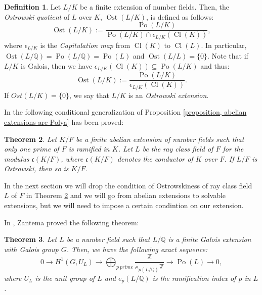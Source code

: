 \documentclass{amsart}
\newtheorem{theorem}{Theorem}[section]
\theoremstyle{definition}
\newtheorem{definition}[theorem]{Definition}
\numberwithin{equation}{section}
\DeclareMathOperator{\Po}{Po}
\DeclareMathOperator{\Ost}{Ost}
\DeclareMathOperator{\Cl}{Cl}
\begin{document}
\begin{definition} \label{definition, Ostrowski quotient}
Let $L/K$ be a finite extension of number fields. Then, the \textit{Ostrowski quotient} of $L$ over $K$, $\Ost(L/K)$, is defined as follows:
	\begin{equation*} \label{equation, Ostrowski quotient}
	\Ost(L/K) := \frac{\Po(L/K)}{\Po(L/K) \cap \epsilon_{L/K}(\Cl(K))},
	\end{equation*} 
	where $\epsilon_{L/K}$ is the \textit{Capitulation map} from $\Cl(K)$ to $\Cl(L)$.
	In particular, $\Ost(L/\mathbb{Q})=\Po(L/\mathbb{Q})=\Po(L)$ and $\Ost(L/L)=\{0\}$. Note that if $L/K$ is Galois, then we have $\epsilon_{L/K}(\Cl(K)) \subseteq \Po(L/K)$ and thus:
	\begin{equation*} \label{equation, Ostrowski quotient Galois case}
	\Ost(L/K) := \frac{\Po(L/K)}{\epsilon_{L/K}(\Cl(K))}.
	\end{equation*} 
If $Ost(L/K)=\{0\}$, we say that $L/K$ is an \textit{Ostrowski extension}.
\end{definition}

In \cite{SRM} the following conditional generalization of Proposition \ref{proposition, abelian extensions are Polya} has been proved:

\begin{theorem} \cite[Theorem $3.6$]{SRM} \label{theorem, abelian extensions are Ostrowski, conditional}
Let $K/F$ be a finite abelian extension of number fields such that only one prime of $F$ is ramified in $K$. Let $L$ be the ray class field of $F$ for the modulus $\mathfrak{c}(K/F)$, where $\mathfrak{c}(K/F)$ denotes the conductor of $K$ over $F$. If $L/F$ is Ostrowski, then so is $K/F$.
\end{theorem} 

In the next section we will drop the condition of Ostrowskiness of ray class field $L$ of $F$ in Theorem \ref{theorem, abelian extensions are Ostrowski, conditional} and we will go from abelian extensions to solvable extensions, but we will need to impose a certain condintion on our extension.

In \cite[p.$163$]{Zantema}, Zantema proved the following theorem:

\begin{theorem} \label{theorem, Zantema's exact sequence}
Let $L$ be a number field such that $L/\mathbb{Q}$ is a finite Galois extension with Galois group $G$. Then, we have the following exact sequence:
\begin{equation*} \label{equation, Zantema's exact sequence}
0 \rightarrow H^1(G,U_L) \rightarrow \bigoplus_{p \: prime} \frac{\mathbb{Z}}{e_{p(L/\mathbb{Q})}\mathbb{Z}} \rightarrow \Po(L) \rightarrow 0,
\end{equation*}
where $U_L$ is the unit group of $L$ and $e_p(L/\mathbb{Q})$ is the ramification index of $p$ in $L$.
\end{theorem}
\end{document}
